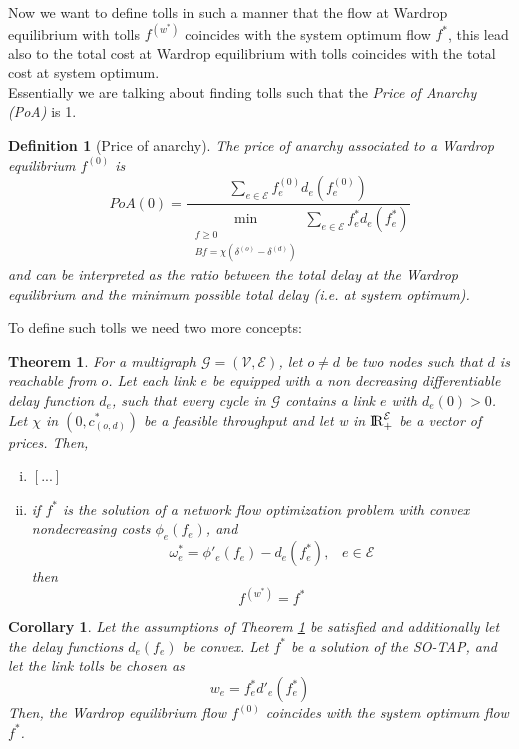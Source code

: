 \documentclass[
	12pt, %
]{fphw}
\newtheorem{theorem}{Theorem}
\newtheorem{corollary}{Corollary}[theorem]
\newtheorem{definition}{Definition}
\begin{document}
\begin{enumerate}[{\bfseries (a)}]
    Now we want to define tolls in such a manner that the flow at Wardrop equilibrium with tolls $f^{(w^*)}$ coincides with the system optimum flow $f^*$, this lead also to the total cost at Wardrop equilibrium with tolls coincides with the total cost at system optimum. \\
    Essentially we are talking about finding tolls such that the \emph{Price of Anarchy (PoA)} is 1.
    
    \begin{definition}[Price of anarchy]
    The price of anarchy associated to a Wardrop equilibrium $f^{(0)}$ is
        $$
            PoA(0) = \frac{\sum\limits_{{e \in \mathcal{E}}}f_e^{(0)} d_e(f_e^{(0)})}
            {\min\limits_{{\substack{\\f \geq 0\\ Bf = \chi(\delta^{(o)} - \delta^{(d)})}}} \sum_{e \in \mathcal{E}}f_e^* d_e(f_e^*)}
        $$
    and can be interpreted as the ratio between the total delay at the Wardrop equilibrium and the minimum possible total delay (i.e. at system optimum).
    \end{definition}
    
    To define such tolls we need two more concepts:
    \begin{theorem}\label{theo:derT}
        For a multigraph $\mathcal{G} = (\mathcal{V}, \mathcal{E})$, let
        $o \neq d$ be two nodes such that $d$ is reachable from $o$. Let
        each link $e$ be equipped with a non decreasing differentiable
        delay function $d_e$, such that every cycle in $\mathcal{G}$
        contains a link $e$ with $d_e(0) > 0$. Let $\chi$ in $(0,
        c^*_{(o,d)})$ be a feasible throughput and let w in
        ${\rm I\!R}_+^{\mathcal{E}}$ be a vector of prices. Then,
        \begin{enumerate}[(i)]
            \item $\left[...\right]$
            \item if $f^*$ is the solution of a network flow optimization problem with convex nondecreasing costs $\phi_e(f_e)$, and
            $$ \omega_e^* =  \phi'_e(f_e) - d_e(f^*_e), \hspace{10pt} e \in \mathcal{E} $$
            then
            $$ f^{(w^*)} = f^* $$
        \end{enumerate}
    \end{theorem}
    \begin{corollary}\label{cor:corDer}
    Let the assumptions of Theorem \ref{theo:derT} be satisfied and additionally let the delay functions $d_e(f_e)$ be convex. Let $f^*$ be a solution of the SO-TAP, and let the link tolls be chosen as 
    $$w_e = f^*_ed'_e(f^*_e )$$
    Then, the Wardrop equilibrium flow $f^{(0)}$ coincides with the system optimum flow $f^*$.
    \end{corollary}
    

\end{enumerate}
\end{document}
